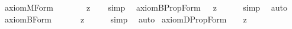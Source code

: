 \begin{isabellebody}
%
\endisatagproof
{\isafoldproof}%
%
\isadelimproof
%
\endisadelimproof
\isanewline
{}\isamarkupfalse%
\ axiom{\isacharunderscore}M{\isacharunderscore}Form{\isacharcolon}\ \ \ \ \ {\isachardoublequoteopen}{\isacharbrackleft}{\isasymforall}{\isacharparenleft}{\isasymlambda}{\isasymphi}{\isachardot}\ {\isacharparenleft}{\isasymbox}\ {\isacharsemicolon}{\isasymphi}{\isacharsemicolon}{\isacharparenright}\ {\isasymrightarrow}\isactrlsup z\ {\isacharsemicolon}{\isasymphi}{\isacharsemicolon}{\isacharparenright}{\isacharbrackright}{\isachardoublequoteclose}%
\isadelimproof
\ %
\endisadelimproof
%
\isatagproof
{}\isamarkupfalse%
\ {\isacharparenleft}simp{\isacharparenright}\ \isamarkupfalse%
%
\endisatagproof
{\isafoldproof}%
%
\isadelimproof
%
\endisadelimproof
\isanewline
\isanewline
{}\isamarkupfalse%
\ axiom{\isacharunderscore}B{\isacharunderscore}PropForm{\isacharcolon}\ {\isachardoublequoteopen}{\isacharbrackleft}{\isasymforall}{\isacharparenleft}{\isasymlambda}{\isasymphi}{\isachardot}\ {\isacharcomma}{\isasymphi}{\isacharcomma}\ {\isasymrightarrow}\isactrlsup z\ {\isacharparenleft}{\isasymbox}\ {\isacharparenleft}{\isasymdiamond}\ {\isacharcomma}{\isasymphi}{\isacharcomma}{\isacharparenright}{\isacharparenright}{\isacharparenright}{\isacharbrackright}{\isachardoublequoteclose}%
\isadelimproof
\ %
\endisadelimproof
%
\isatagproof
{}\isamarkupfalse%
\ {\isacharparenleft}simp{\isacharparenright}\ \isamarkupfalse%
\ auto%
\endisatagproof
{\isafoldproof}%
%
\isadelimproof
%
\endisadelimproof
\isanewline
{}\isamarkupfalse%
\ axiom{\isacharunderscore}B{\isacharunderscore}Form{\isacharcolon}\ \ \ \ \ {\isachardoublequoteopen}{\isacharbrackleft}{\isasymforall}{\isacharparenleft}{\isasymlambda}{\isasymphi}{\isachardot}\ {\isacharsemicolon}{\isasymphi}{\isacharsemicolon}\ {\isasymrightarrow}\isactrlsup z\ {\isacharparenleft}{\isasymbox}\ {\isacharparenleft}{\isasymdiamond}\ {\isacharsemicolon}{\isasymphi}{\isacharsemicolon}{\isacharparenright}{\isacharparenright}{\isacharparenright}{\isacharbrackright}{\isachardoublequoteclose}%
\isadelimproof
\ %
\endisadelimproof
%
\isatagproof
{}\isamarkupfalse%
\ {\isacharparenleft}simp{\isacharparenright}\ \isamarkupfalse%
\ auto%
\endisatagproof
{\isafoldproof}%
%
\isadelimproof
%
\endisadelimproof
\isanewline
\isanewline
{}\isamarkupfalse%
\ axiom{\isacharunderscore}D{\isacharunderscore}PropForm{\isacharcolon}\ {\isachardoublequoteopen}{\isacharbrackleft}{\isasymforall}{\isacharparenleft}{\isasymlambda}{\isasymphi}{\isachardot}\ {\isacharparenleft}{\isasymbox}\ {\isacharcomma}{\isasymphi}{\isacharcomma}{\isacharparenright}\ {\isasymrightarrow}\isactrlsup z\ {\isacharparenleft}{\isasymbox}\ {\isacharparenleft}{\isasymbox}\ {\isacharcomma}{\isasymphi}{\isacharcomma}{\isacharparenright}{\isacharparenright}{\isacharparenright}{\isacharbrackright}{\isachardoublequoteclose}%

\end{isabellebody}
